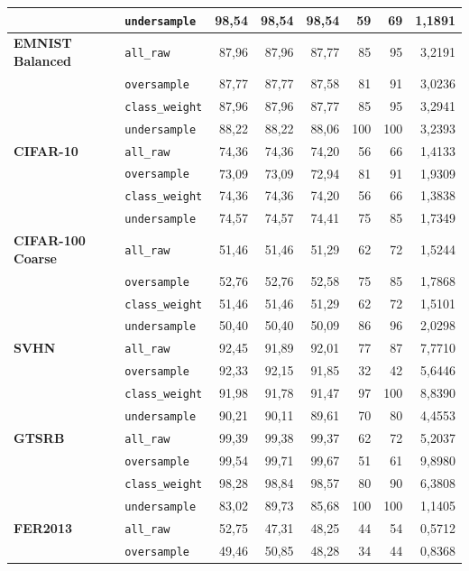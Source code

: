 \documentclass[
    12pt,
    openright,
    oneside,
    a4paper,
    english,
    brazil
]{abntex2}
\begin{document}
{\begin{longtable}{llrrrrrr}
 & \texttt{undersample} & 98,54 & 98,54 & 98,54 & 59 & 69 & 1,1891 \\
\midrule
\textbf{EMNIST Balanced} & \texttt{all\_raw} & 87,96 & 87,96 & 87,77 & 85 & 95 & 3,2191 \\
 & \texttt{oversample} & 87,77 & 87,77 & 87,58 & 81 & 91 & 3,0236 \\
 & \texttt{class\_weight} & 87,96 & 87,96 & 87,77 & 85 & 95 & 3,2941 \\
 & \texttt{undersample} & 88,22 & 88,22 & 88,06 & 100 & 100 & 3,2393 \\
\midrule
\textbf{CIFAR-10} & \texttt{all\_raw} & 74,36 & 74,36 & 74,20 & 56 & 66 & 1,4133 \\
 & \texttt{oversample} & 73,09 & 73,09 & 72,94 & 81 & 91 & 1,9309 \\
 & \texttt{class\_weight} & 74,36 & 74,36 & 74,20 & 56 & 66 & 1,3838 \\
 & \texttt{undersample} & 74,57 & 74,57 & 74,41 & 75 & 85 & 1,7349 \\
\midrule
\textbf{CIFAR-100 Coarse} & \texttt{all\_raw} & 51,46 & 51,46 & 51,29 & 62 & 72 & 1,5244 \\
 & \texttt{oversample} & 52,76 & 52,76 & 52,58 & 75 & 85 & 1,7868 \\
 & \texttt{class\_weight} & 51,46 & 51,46 & 51,29 & 62 & 72 & 1,5101 \\
 & \texttt{undersample} & 50,40 & 50,40 & 50,09 & 86 & 96 & 2,0298 \\
\pagebreak
\textbf{SVHN} & \texttt{all\_raw} & 92,45 & 91,89 & 92,01 & 77 & 87 & 7,7710 \\
 & \texttt{oversample} & 92,33 & 92,15 & 91,85 & 32 & 42 & 5,6446 \\
 & \texttt{class\_weight} & 91,98 & 91,78 & 91,47 & 97 & 100 & 8,8390 \\
 & \texttt{undersample} & 90,21 & 90,11 & 89,61 & 70 & 80 & 4,4553 \\
\midrule
\textbf{GTSRB} & \texttt{all\_raw} & 99,39 & 99,38 & 99,37 & 62 & 72 & 5,2037 \\
 & \texttt{oversample} & 99,54 & 99,71 & 99,67 & 51 & 61 & 9,8980 \\
 & \texttt{class\_weight} & 98,28 & 98,84 & 98,57 & 80 & 90 & 6,3808 \\
 & \texttt{undersample} & 83,02 & 89,73 & 85,68 & 100 & 100 & 1,1405 \\
\midrule
\textbf{FER2013} & \texttt{all\_raw} & 52,75 & 47,31 & 48,25 & 44 & 54 & 0,5712 \\
 & \texttt{oversample} & 49,46 & 50,85 & 48,28 & 34 & 44 & 0,8368 \\

\end{longtable}}
\end{document}
